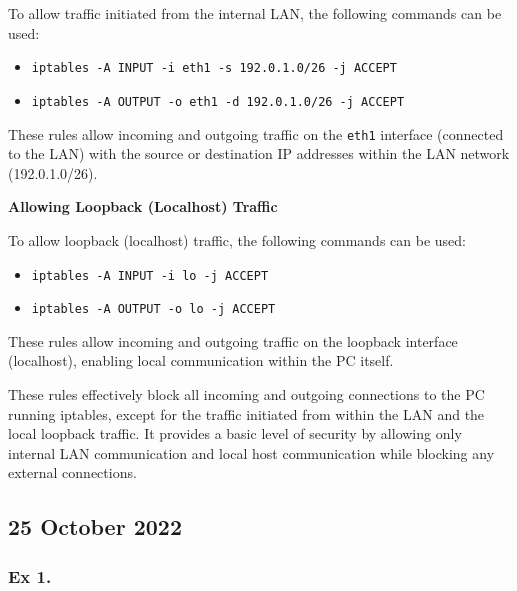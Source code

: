 {\begin{enumerate}
			To allow traffic initiated from the internal LAN, the following commands can be used:
			
			\begin{sloppypar}
				\begin{itemize}
					\item \texttt{iptables -A INPUT -i eth1 -s 192.0.1.0/26 -j ACCEPT}
					\item \texttt{iptables -A OUTPUT -o eth1 -d 192.0.1.0/26 -j ACCEPT}
				\end{itemize}
			\end{sloppypar}
			
			These rules allow incoming and outgoing traffic on the \texttt{eth1} interface (connected to the LAN) with the source or destination IP addresses within the LAN network (192.0.1.0/26).
			
			\textbf{Allowing Loopback (Localhost) Traffic}
			
			To allow loopback (localhost) traffic, the following commands can be used:
			
			\begin{sloppypar}
				\begin{itemize}
					\item \texttt{iptables -A INPUT -i lo -j ACCEPT}
					\item \texttt{iptables -A OUTPUT -o lo -j ACCEPT}
				\end{itemize}
			\end{sloppypar}
			
			These rules allow incoming and outgoing traffic on the loopback interface (localhost), enabling local communication within the PC itself.
			
			These rules effectively block all incoming and outgoing connections to the PC running iptables, except for the traffic initiated from within the LAN and the local loopback traffic. It provides a basic level of security by allowing only internal LAN communication and local host communication while blocking any external connections.
	\end{enumerate}}

	\newpage
	\subsection{25 October 2022}	

\subsubsection{Ex 1.}	
	\configuratedText{
	\begin{enumerate}
	\item 
	\item
	\item 
	\end{enumerate}}

